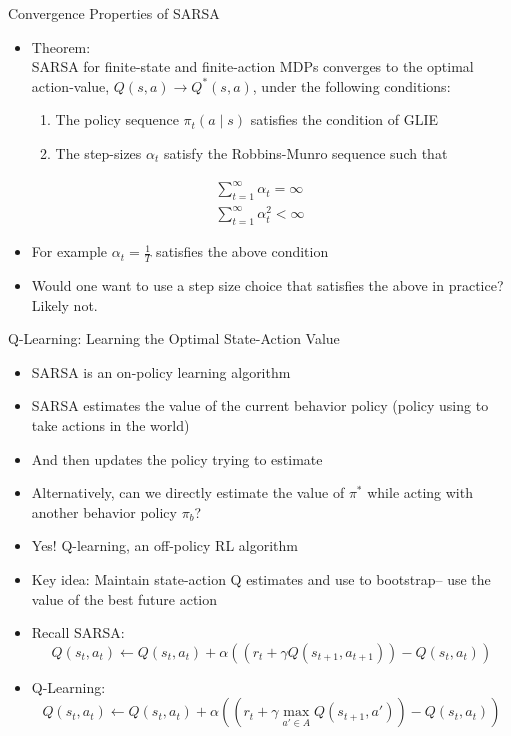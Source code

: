\begin{frame}[c]{Convergence Properties of SARSA}
	
	\begin{itemize}
		\item Theorem:\\
		SARSA for finite-state and finite-action MDPs converges to the optimal
		action-value, $Q(s, a) \to  Q^*(s, a)$, under the following conditions:
		\begin{enumerate}
			\item The policy sequence $\pi_t(a \mid s)$ satisfies the condition of GLIE
			\item The step-sizes $\alpha_t$ satisfy the \alert{Robbins-Munro sequence} such that
		\end{enumerate}
	\end{itemize}
	\begin{eqnarray}
	\sum_{t=1}^{\infty} \alpha_t = \infty \nonumber \\
	\sum_{t=1}^{\infty} \alpha^2_t < \infty \nonumber
	\end{eqnarray}
	
	\begin{itemize}
		\item For example $\alpha_t= \frac{1}{T}$ satisfies the above condition
		\item Would one want to use a step size choice that satisfies the above in
		practice? Likely not.
	\end{itemize}
	
\end{frame}
\begin{frame}[c]{Q-Learning: Learning the Optimal State-Action Value}
	
	\begin{itemize}
		\item SARSA is an on-policy learning algorithm
		\item SARSA estimates the value of the current behavior policy (policy
		using to take actions in the world)
		\item And then updates the policy trying to estimate
		\item Alternatively, can we directly estimate the value of $\pi^*$ while acting 	with another behavior policy $\pi_b$?
		\item Yes! Q-learning, an off-policy RL algorithm
		\item Key idea: Maintain state-action Q estimates and use to bootstrap–
		use the value of the best future action
		\item Recall SARSA:
		$$ Q(s_t, a_t) \gets Q(s_t, a_t) + \alpha((r_t + \gamma Q(s_{t+1}, a_{t+1})) - Q(s_t, a_t))$$
		\item Q-Learning:
		$$Q(s_t, a_t) \gets Q(s_t, a_t) + \alpha((r_t + \gamma \max_{a' \in A}Q(s_{t+1},a')) - Q(s_t, a_t)) $$
	\end{itemize}
	
\end{frame}
